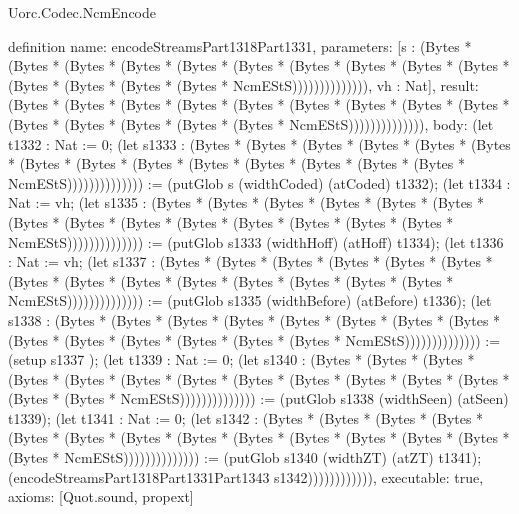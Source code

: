 \begin{lexlean}{Uorc.Codec.NcmEncode}
\begin{semanticmodule}
definition{
  name: encodeStreamsPart1318Part1331,
  parameters: [s : (Bytes * (Bytes * (Bytes * (Bytes * (Bytes * (Bytes * (Bytes * (Bytes * (Bytes * (Bytes * (Bytes * (Bytes * (Bytes * (Bytes * NcmEStS)))))))))))))), vh : Nat],
  result: (Bytes * (Bytes * (Bytes * (Bytes * (Bytes * (Bytes * (Bytes * (Bytes * (Bytes * (Bytes * (Bytes * (Bytes * (Bytes * (Bytes * NcmEStS)))))))))))))),
  body: (let t1332 : Nat := 0; (let s1333 : (Bytes * (Bytes * (Bytes * (Bytes * (Bytes * (Bytes * (Bytes * (Bytes * (Bytes * (Bytes * (Bytes * (Bytes * (Bytes * (Bytes * NcmEStS)))))))))))))) := (putGlob s (widthCoded) (atCoded) t1332); (let t1334 : Nat := vh; (let s1335 : (Bytes * (Bytes * (Bytes * (Bytes * (Bytes * (Bytes * (Bytes * (Bytes * (Bytes * (Bytes * (Bytes * (Bytes * (Bytes * (Bytes * NcmEStS)))))))))))))) := (putGlob s1333 (widthHoff) (atHoff) t1334); (let t1336 : Nat := vh; (let s1337 : (Bytes * (Bytes * (Bytes * (Bytes * (Bytes * (Bytes * (Bytes * (Bytes * (Bytes * (Bytes * (Bytes * (Bytes * (Bytes * (Bytes * NcmEStS)))))))))))))) := (putGlob s1335 (widthBefore) (atBefore) t1336); (let s1338 : (Bytes * (Bytes * (Bytes * (Bytes * (Bytes * (Bytes * (Bytes * (Bytes * (Bytes * (Bytes * (Bytes * (Bytes * (Bytes * (Bytes * NcmEStS)))))))))))))) := (setup s1337 ); (let t1339 : Nat := 0; (let s1340 : (Bytes * (Bytes * (Bytes * (Bytes * (Bytes * (Bytes * (Bytes * (Bytes * (Bytes * (Bytes * (Bytes * (Bytes * (Bytes * (Bytes * NcmEStS)))))))))))))) := (putGlob s1338 (widthSeen) (atSeen) t1339); (let t1341 : Nat := 0; (let s1342 : (Bytes * (Bytes * (Bytes * (Bytes * (Bytes * (Bytes * (Bytes * (Bytes * (Bytes * (Bytes * (Bytes * (Bytes * (Bytes * (Bytes * NcmEStS)))))))))))))) := (putGlob s1340 (widthZT) (atZT) t1341); (encodeStreamsPart1318Part1331Part1343 s1342)))))))))))),
  executable: true,
  axioms: [Quot.sound, propext]
}


\end{semanticmodule}
\end{lexlean}
